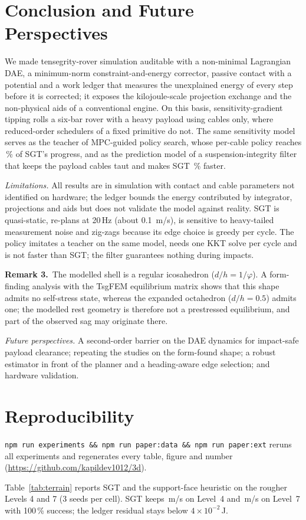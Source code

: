 \documentclass[letterpaper,10pt,conference]{IEEEtran}
\newcommand{\remark}[1]{\noindent\textbf{Remark #1.}\ }
\newcommand{\coderepo}{\url{https://github.com/kapildev1012/3d}}
\begin{document}
\section{Conclusion and Future Perspectives}
We made tensegrity-rover simulation auditable with a non-minimal
Lagrangian DAE, a minimum-norm constraint-and-energy corrector, passive
contact with a potential and a work ledger that measures the unexplained
energy of every step before it is corrected; it exposes the
kilojoule-scale projection exchange and the non-physical aids of a
conventional engine. On this basis, sensitivity-gradient tipping rolls
a six-bar rover with a heavy payload using cables only, where
reduced-order schedulers of a fixed primitive do not. The same
sensitivity model serves as the teacher of MPC-guided policy search,
whose per-cable policy reaches \gpsRatio\,\% of SGT's progress, and as
the prediction model of a suspension-integrity filter that keeps the
payload cables taut and makes SGT \shProgGainSgt\,\% faster.

\emph{Limitations.} All results are in simulation with contact and cable
parameters not identified on hardware; the ledger bounds the energy
contributed by integrator, projections and aids but does not validate
the model against reality. SGT is quasi-static, re-plans at 20\,Hz
(about \SI{0.1}{m/s}), is sensitive to heavy-tailed measurement noise
and zig-zags because its edge choice is greedy per cycle. The policy
imitates a teacher on the same model, needs one KKT solve per cycle and
is not faster than SGT; the filter guarantees nothing during impacts.

\remark{3}The modelled shell is a regular icosahedron ($d/h=1/\varphi$).
A form-finding analysis with the TsgFEM equilibrium matrix
\cite{ma2022tsgfem} shows that this shape admits no self-stress state,
whereas the expanded octahedron ($d/h=0.5$) admits one; the modelled
rest geometry is therefore not a prestressed equilibrium, and part of
the observed sag may originate there.

\emph{Future perspectives.} A second-order barrier on the DAE dynamics
for impact-safe payload clearance; repeating the studies on the
form-found shape; a robust estimator in front of the planner and a
heading-aware edge selection; and hardware validation.

\section*{Reproducibility}
\texttt{npm run experiments \&\& npm run paper:data \&\& npm run paper:ext}
reruns all experiments and regenerates every table, figure and number
(\coderepo).


Table~\ref{tab:terrain} reports SGT and the support-face heuristic on
the rougher Levels 4 and 7 (3 seeds per cell). SGT keeps
\gFourSpeed\,m/s on Level~4 and \gSevenSpeed\,m/s on Level~7 with
100\,\% success; the ledger residual stays below $4\times10^{-2}$\,J.




\end{document}
